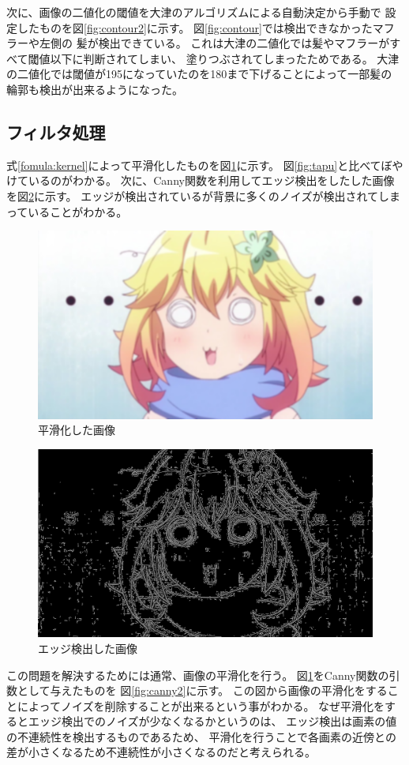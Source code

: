\documentclass[dvipdfmx]{jsarticle}
\begin{document}
次に、画像の二値化の閾値を大津のアルゴリズムによる自動決定から手動で
設定したものを図\ref{fig:contour2}に示す。
図\ref{fig:contour}では検出できなかったマフラーや左側の
髪が検出できている。
これは大津の二値化では髪やマフラーがすべて閾値以下に判断されてしまい、
塗りつぶされてしまったためである。
大津の二値化では閾値が195になっていたのを180まで下げることによって一部髪の
輪郭も検出が出来るようになった。

\subsection{フィルタ処理}

式\ref{fomula:kernel}によって平滑化したものを図\ref{fig:smoothing}に示す。
図\ref{fig:tapu}と比べてぼやけているのがわかる。
次に、Canny関数を利用してエッジ検出をしたした画像を図\ref{fig:canny1}に示す。
エッジが検出されているが背景に多くのノイズが検出されてしまっていることがわかる。

\begin{figure}[htbp]
  \centering
  \includegraphics[width=0.7\hsize]{../pic/smoothing.png}
  \caption{平滑化した画像}
  \label{fig:smoothing}
\end{figure}
\begin{figure}[htbp]
  \centering
  \includegraphics[width=0.7\hsize]{../pic/canny1.png}
  \caption{エッジ検出した画像}
  \label{fig:canny1}
\end{figure}

この問題を解決するためには通常、画像の平滑化を行う。
図\ref{fig:smoothing}をCanny関数の引数として与えたものを
図\ref{fig:canny2}に示す。
この図から画像の平滑化をすることによってノイズを削除することが出来るという事がわかる。
なぜ平滑化をするとエッジ検出でのノイズが少なくなるかというのは、
エッジ検出は画素の値の不連続性を検出するものであるため、
平滑化を行うことで各画素の近傍との差が小さくなるため不連続性が小さくなるのだと考えられる。
\end{document}
